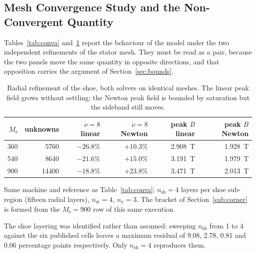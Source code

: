 \documentclass[10pt,a4paper,twocolumn]{article}
\theoremstyle{plain}
\theoremstyle{remark}
\begin{document}
\subsection{Mesh Convergence Study and the Non-Convergent Quantity}
\label{sub:conv}

Tables~\ref{tab:conva} and~\ref{tab:convb} report the behaviour of the
model under the two independent refinements of the stator mesh. They
must be read as a pair, because the two panels move the same quantity in
opposite directions, and that opposition carries the argument of
Section~\ref{sec:bounds}.

\begin{table}[!t]
\centering
\begin{threeparttable}
\footnotesize
\begin{tabular}{rrrrrr}
\toprule
$M_{\mathrm{s}}$ & unknowns & $\nu=8$ linear & $\nu=8$ Newton
& peak $B$ linear & peak $B$ Newton\\
\midrule
360 & \num{5760}  & $-26.8\%$ & $+10.3\%$ & \SI{2.908}{\tesla} & \SI{1.928}{\tesla}\\
540 & \num{8640}  & $-21.6\%$ & $+15.0\%$ & \SI{3.191}{\tesla} & \SI{1.979}{\tesla}\\
900 & \num{14400} & $-18.8\%$ & $+23.8\%$ & \SI{3.471}{\tesla} & \SI{2.013}{\tesla}\\
\bottomrule
\end{tabular}
\begin{tablenotes}[flushleft]\footnotesize
\item Same machine and reference as Table~\ref{tab:conva};
$n_{\mathrm{sh}}=4$ layers per shoe sub-region (fifteen radial layers),
$n_{\mathrm{st}}=4$, $n_{\mathrm{y}}=3$. The bracket of
Section~\ref{sub:corner} is formed from the $M_{\mathrm{s}}=900$ row of
this same execution.
\item The shoe layering was identified rather than assumed: sweeping
$n_{\mathrm{sh}}$ from 1 to 4 against the six published cells leaves a
maximum residual of \num{9.08}, \num{2.78}, \num{0.81} and \num{0.06}
percentage points respectively. Only $n_{\mathrm{sh}}=4$ reproduces
them.
\end{tablenotes}
\end{threeparttable}
\caption{Radial refinement of the shoe, both solvers on identical
meshes. The linear peak field grows without settling; the Newton peak
field is bounded by saturation but the sideband still moves.}
\label{tab:convb}
\end{table}
\end{document}
